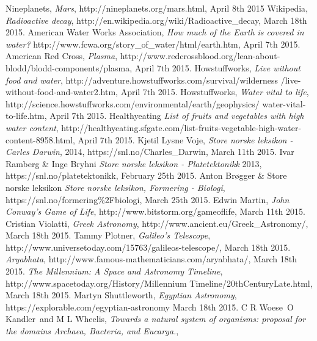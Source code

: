\begin{thebibliography}{99}
		Nineplanets,
		\emph{Mars},
		http://nineplanets.org/mars.html,
		April 8th 2015
		Wikipedia,
		\emph{Radioactive decay},
		http://en.wikipedia.org/wiki/Radioactive\_decay,
		March 18th 2015.
		American Water Works Association,
		\emph{How much of the Earth is covered in water?}
		http://www.fcwa.org/story\_of\_water/html/earth.htm,
		April 7th 2015.
		American Red Cross,
		\emph{Plasma},
		http://www.redcrossblood.org/lean-about-blodd/blodd-components/plasma,
		April 7th 2015.
		Howstuffworks,
		\emph{Live without food and water},
		http://adventure.howstuffworks.com/survival/wilderness /live-without-food-and-water2.htm,
		April 7th 2015.
		Howstuffworks,
		\emph{Water vital to life},
		http://science.howstuffworks.com/environmental/earth/geophysics/ water-vital-to-life.htm,
		April 7th 2015.
		Healthyeating
		\emph{List of fruits and vegetables with high water content},
		http://healthyeating.sfgate.com/list-fruits-vegetable-high-water-content-8958.html,
		April 7th 2015.
		Kjetil Lysne Voje,
		\emph{Store norske leksikon - Carles Darwin},
		2014,
		https://snl.no/Charles\_Darwin,
		March 11th 2015.
		Ivar Ramberg \& Inge Bryhni
		\emph{Store norske leksikon - Platetektonikk}
		2013,
		https://snl.no/platetektonikk,
		February 25th 2015.
		Anton Brøgger \& Store norske leksikon
		\emph{Store norske leksikon, Formering - Biologi},
		https://snl.no/formering\%2Fbiologi,
		March 25th 2015.
		Edwin Martin,
		\emph{John Conway's Game of Life},
		http://www.bitstorm.org/gameoflife,
		March 11th 2015.
		Cristian Violatti,
		\emph{Greek Astronomy},
		http://www.ancient.eu/Greek\_Astronomy/,
		March 18th 2015.
		Tammy Plotner,
		\emph{Galileo's Telescope},
		http://www.universetoday.com/15763/galileos-telescope/,
		March 18th 2015.
		\emph{Aryabhata},
		http://www.famous-mathematicians.com/aryabhata/,
		March 18th 2015.
		\emph{The Millennium: A Space and Astronomy Timeline},
		http://www.spacetoday.org/History/Millennium Timeline/20thCenturyLate.html,
		March 18th 2015.
		Martyn Shuttleworth,
		\emph{Egyptian Astronomy},
		https://explorable.com/egyptian-astronomy
		March 18th 2015.
		C R Woese\, O Kandler\, and M L Wheelis,
		\emph{Towards a natural system of organisms: proposal for the domains Archaea, Bacteria, and Eucarya.},

\end{thebibliography}
